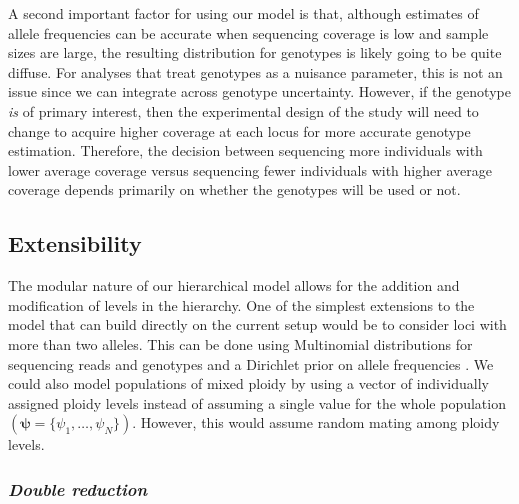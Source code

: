 \documentclass[11pt,english,letterpaper,oneside]{article}
\begin{document}
A second important factor for using our model is that, although estimates of allele frequencies can be accurate when sequencing coverage is low and sample sizes are large, the resulting distribution for genotypes is likely going to be quite diffuse. For analyses that treat genotypes as a nuisance parameter, this is not an issue since we can integrate across genotype uncertainty. However, if the genotype \textit{is} of primary interest, then the experimental design of the study will need to change to acquire higher coverage at each locus for more accurate genotype estimation. Therefore, the decision between sequencing more individuals with lower average coverage versus sequencing fewer individuals with higher average coverage depends primarily on whether the genotypes will be used or not.

\medskip
\subsection{Extensibility}
\medskip

The modular nature of our hierarchical model allows for the addition and modification of levels in the hierarchy. One of the simplest extensions to the model that can build directly on the current setup would be to consider loci with more than two alleles. This can be done using Multinomial distributions for sequencing reads and genotypes and a Dirichlet prior on allele frequencies \citep[the Multinomial and Dirichlet distributions form a conjugate family;][]{gelman2014bayesian}. We could also model populations of mixed ploidy by using a vector of individually assigned ploidy levels instead of assuming a single value for the whole population $(\bm{\psi} = \{\psi_1,\ldots,\psi_N\})$. However, this would assume random mating among ploidy levels.
\medskip


\subsubsection{{\itshape Double reduction}}
\medskip
\end{document}
